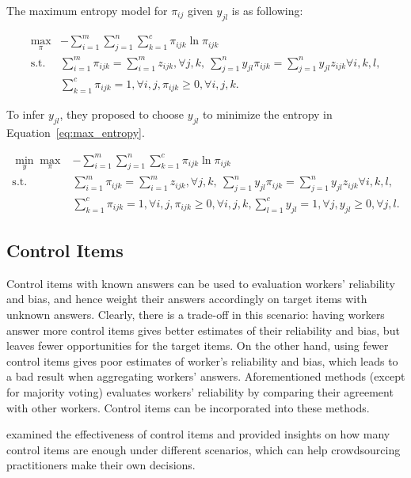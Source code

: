 \documentclass{article}
\begin{document}
The maximum entropy model for $\pi_{ij}$ given $y_{jl}$ is as
following:

\begin{align}
\max_{\pi} & -\sum_{i=1}^{m}\sum_{j=1}^{n}\sum_{k=1}^{c} \pi_{ijk}
\ln \pi_{ijk} \nonumber \\
  \mathrm{s.t.} & \sum_{i=1}^{m}\pi_{ijk} = \sum_{i=1}^{m}z_{ijk},
                  \forall j,k, ~ \sum_{j=1}^{n}y_{jl}\pi_{ijk} =
                  \sum_{j=1}^{n}y_{jl}z_{ijk} \forall i,k,l, \nonumber
  \\
  & \sum_{k=1}^{c}\pi_{ijk}=1, \forall i,j, \pi_{ijk} \geq 0, \forall
    i,j,k. \label{eq:max_entropy}
\end{align}

To infer $y_{jl}$, they proposed to choose $y_{jl}$ to minimize the
entropy in Equation~\ref{eq:max_entropy}.

\begin{align}
\min_{y}\max_{\pi} & -\sum_{i=1}^{m}\sum_{j=1}^{n}\sum_{k=1}^{c} \pi_{ijk}
\ln \pi_{ijk} \nonumber \\
  \mathrm{s.t.} & \sum_{i=1}^{m}\pi_{ijk} = \sum_{i=1}^{m}z_{ijk},
                  \forall j,k, ~ \sum_{j=1}^{n}y_{jl}\pi_{ijk} =
                  \sum_{j=1}^{n}y_{jl}z_{ijk} \forall i,k,l, \nonumber
  \\
  & \sum_{k=1}^{c}\pi_{ijk}=1, \forall i,j, \pi_{ijk} \geq 0, \forall
    i,j,k, \sum_{l=1}^{c}y_{jl}=1, \forall j, y_{jl} \geq 0, \forall
    j, l. \label{eq:minimax_entropy}
\end{align}

\subsection{Control Items}
Control items with known answers can be used to evaluation workers'
reliability and bias, and hence weight their answers accordingly on target
items with unknown answers. Clearly, there is a trade-off in this
scenario: having workers answer more control items gives better
estimates of their reliability and bias, but leaves fewer opportunities for the
target items. On the other hand, using fewer control items gives poor
estimates of worker's reliability and bias, which leads to a bad
result when aggregating workers' answers. Aforementioned methods
(except for majority voting) evaluates workers' reliability by
comparing their agreement with other workers. Control items can be
incorporated into these methods.

\cite{Liu2013-ck} examined the effectiveness of control items and
provided insights on how many control items are enough under
different scenarios, which can help crowdsourcing practitioners make
their own decisions.
\end{document}
